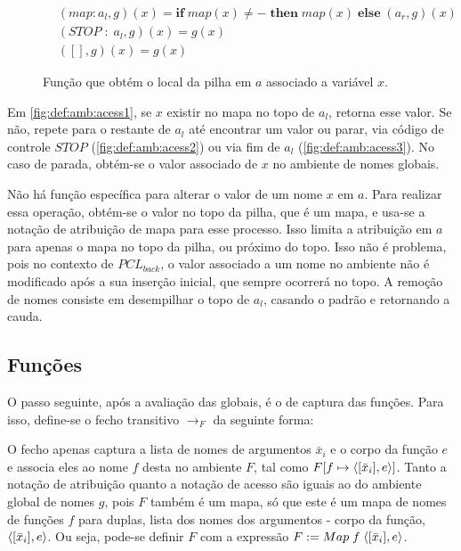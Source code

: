 \begin{figure}[ht]
	\begin{align}
		&(map : a_l, g)(x) = \mathbf{if}\; map(x) \neq - \;\mathbf{then}\; map(x) \;\mathbf{else}\; (a_r, g)(x)\label{fig:def:amb:acess1}\\
		&(STOP \;:\;a_l, g)(x) = g(x) \label{fig:def:amb:acess2}\\
		&([], g)(x) = g(x)\label{fig:def:amb:acess3}
	\end{align}
	\caption{Função que obtém o local da pilha em $a$ associado a variável $x$. }
	\label{fig:def:amb:acess}
\end{figure}

Em \ref{fig:def:amb:acess1}, se $x$ existir no mapa no topo de $a_l$, retorna esse valor. Se não, repete para o restante de $a_l$ até encontrar um valor ou parar, via código de controle $STOP$ (\ref{fig:def:amb:acess2}) ou via fim de $a_l$ (\ref{fig:def:amb:acess3}). No caso de parada, obtém-se o valor associado de $x$ no ambiente de nomes globais.

Não há função específica para alterar o valor de um nome $x$ em $a$. Para realizar essa operação, obtém-se o valor no topo da pilha, que é um mapa, e usa-se a notação de atribuição de mapa para esse processo. Isso limita a atribuição em $a$ para apenas o mapa no topo da pilha, ou próximo do topo. Isso não é problema, pois no contexto de $PCL_{back}$, o valor associado a um nome no ambiente não é modificado após a sua inserção inicial, que sempre ocorrerá no topo. A remoção de nomes consiste em desempilhar o topo de $a_l$, casando o padrão e retornando a cauda.

\subsection{Funções}

O passo seguinte, após a avaliação das globais, é o de captura das funções. Para isso, define-se o fecho transitivo $\to_F$ da seguinte forma:

\noindent O fecho apenas captura a lista de nomes de argumentos $\bar x_i$ e o corpo da função $e$ e associa eles ao nome $f$ desta no ambiente $F$, tal como $F[f \mapsto \langle [\bar x_i], e \rangle]$. Tanto a notação de atribuição quanto a notação de acesso são iguais ao do ambiente global de nomes $g$, pois $F$ também é um mapa, só que este é um mapa de nomes de funções $f$ para duplas, lista dos nomes dos argumentos - corpo da função, $\langle [\bar x_i], e \rangle$. Ou seja, pode-se definir $F$ com a expressão $F := Map\;f\; \langle [\bar x_i], e \rangle$.

